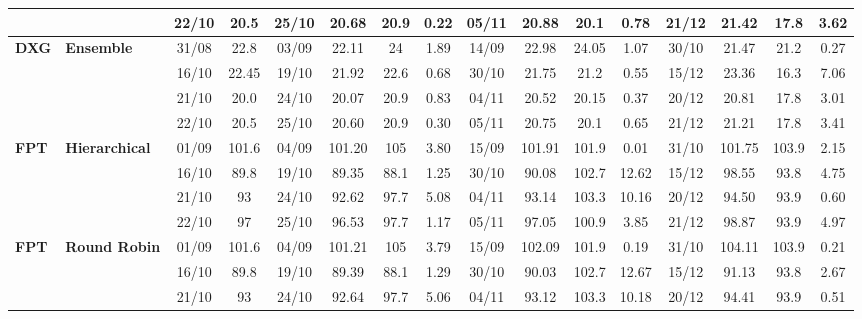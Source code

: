 \begin{table}[!h]
\begin{tabular}{llcc|cccc|cccc|cccc}
&
& 22/10 & 20.5 & 25/10 & 20.68 & 20.9 & 0.22 & 05/11 & 20.88 & 20.1 & 0.78 & 21/12 & 21.42 & 17.8 & 3.62 \\
\midrule


\multirow{4}{*}{\textbf{DXG}} 
& \textbf{Ensemble}
& 31/08 & 22.8 & 03/09 & 22.11 & 24 & 1.89 & 14/09 & 22.98 & 24.05 & 1.07 & 30/10 & 21.47 & 21.2 & 0.27 \\

&
& 16/10 & 22.45 & 19/10 & 21.92 & 22.6 & 0.68 & 30/10 & 21.75 & 21.2 & 0.55 & 15/12 & 23.36 & 16.3 & 7.06 \\

&
& 21/10 & 20.0 & 24/10 & 20.07 & 20.9 & 0.83 & 04/11 & 20.52 & 20.15 & 0.37 & 20/12 & 20.81 & 17.8 & 3.01 \\

&
& 22/10 & 20.5 & 25/10 & 20.60 & 20.9 & 0.30 & 05/11 & 20.75 & 20.1 & 0.65 & 21/12 & 21.21 & 17.8 & 3.41 \\
\midrule



\multirow{4}{*}{\textbf{FPT}} 
& \textbf{Hierarchical}
& 01/09 & 101.6 & 04/09 & 101.20 & 105 & 3.80 & 15/09 & 101.91 & 101.9 & 0.01 & 31/10 & 101.75 & 103.9 & 2.15 \\
&
& 16/10 & 89.8 & 19/10 & 89.35 & 88.1 & 1.25 & 30/10 & 90.08 & 102.7 & 12.62 & 15/12 & 98.55 & 93.8 & 4.75 \\

&
& 21/10 & 93 & 24/10 & 92.62 & 97.7 & 5.08 & 04/11 & 93.14 & 103.3 & 10.16 & 20/12 & 94.50 & 93.9 & 0.60 \\

&
& 22/10 & 97 & 25/10 & 96.53 & 97.7 & 1.17 & 05/11 & 97.05 & 100.9 & 3.85 & 21/12 & 98.87 & 93.9 & 4.97 \\
\midrule


\multirow{4}{*}{\textbf{FPT}} 
& \textbf{Round Robin}
& 01/09 & 101.6 & 04/09 & 101.21 & 105 & 3.79 & 15/09 & 102.09 & 101.9 & 0.19 & 31/10 & 104.11 & 103.9 & 0.21 \\

&
& 16/10 & 89.8 & 19/10 & 89.39 & 88.1 & 1.29 & 30/10 & 90.03 & 102.7 & 12.67 & 15/12 & 91.13 & 93.8 & 2.67 \\

&
& 21/10 & 93 & 24/10 & 92.64 & 97.7 & 5.06 & 04/11 & 93.12 & 103.3 & 10.18 & 20/12 & 94.41 & 93.9 & 0.51 \\


\end{tabular}
\end{table}
